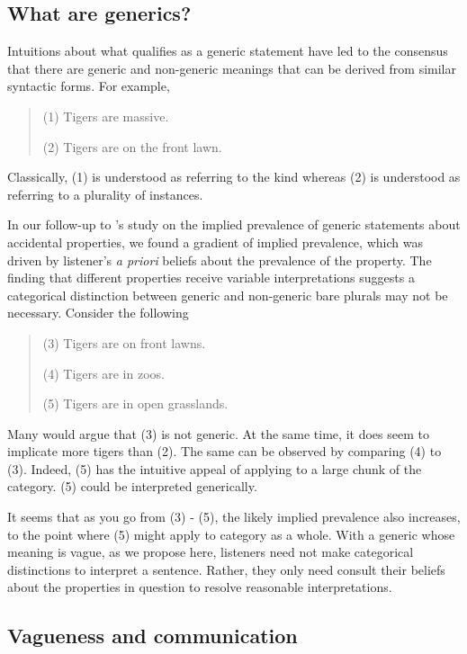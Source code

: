 \documentclass[10pt,letterpaper]{article}
\begin{document}
\subsection{What are generics?}

Intuitions about what qualifies as a generic statement have led to the consensus that there are generic and non-generic meanings that can be derived from similar syntactic forms. For example,
\begin{quotation}
	(1) Tigers are massive. 
	
	(2) Tigers are on the front lawn.
\end{quotation}

Classically, (1) is understood as referring to the kind whereas (2) is understood as referring to a plurality of instances. 

In our follow-up to \citeauthor{Cimpian2010}'s study on the implied prevalence of generic statements about accidental properties, we found a gradient of implied prevalence, which was driven by listener's \emph{a priori} beliefs about the prevalence of the property. 
The finding that different properties receive variable interpretations suggests a categorical distinction between generic and non-generic bare plurals may not be necessary. 
Consider the following 

\begin{quotation}
	(3) Tigers are on front lawns. 
	
	(4) Tigers are in zoos.
	
	(5) Tigers are in open grasslands.
\end{quotation}

Many would argue that (3) is not generic. At the same time, it does seem to implicate more tigers than (2). The same can be observed by comparing (4) to (3). Indeed, (5) has the intuitive appeal of applying to a large chunk of the category. (5) could be interpreted generically. 

It seems that as you go from (3) - (5), the likely implied prevalence also increases, to the point where (5) might apply to category as a whole. 
With a generic whose meaning is vague, as we propose here, listeners need not make categorical distinctions to interpret a sentence. 
Rather, they only need consult their beliefs about the properties in question to resolve reasonable interpretations. 

\subsection{Vagueness and communication}
\end{document}
